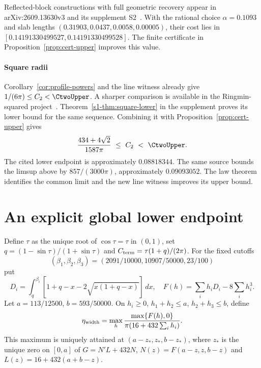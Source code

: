 \documentclass[review,hidelinks,onefignum,onetabnum]{siamart251216}
\begin{document}
\begin{remark}
Reflected-block constructions with full geometric recovery appear in
arXiv:2609.13630v3 and its supplement S2~\cite{supp}. With the rational
choice $\alpha=0.1093$ and slab lengths
$(0.31903,\allowbreak 0.0437,\allowbreak 0.0058,\allowbreak 0.00005)$,
their cost lies in
$[0.14191330499527,\allowbreak 0.14191330499528]$. The finite certificate in
Proposition~\ref{prop:cert-upper} improves this value.
\end{remark}

\paragraph*{Square radii}
Corollary~\ref{cor:profile-powers} and the line witness already give
$1/(6\pi)\le C_2<\CtwoUpper$. A sharper comparison is available in the
Ringmin-squared project~\cite[bounds (22)--(23)]{squared}.
Theorem~\ref{s1-thm:square-lower} in the supplement proves its lower
bound for the same sequence. Combining it with Proposition~\ref{prop:cert-upper} gives
\[
   \frac{434+4\sqrt2}{1587\pi}\ \le\ C_2\ <\ \CtwoUpper .
\]
The cited lower endpoint is approximately $0.08818344$. The same source
bounds the limsup above by $857/(3000\pi)$, approximately $0.09093052$.
The law theorem identifies the common limit and the new line witness
improves its upper bound.

\section{An explicit global lower endpoint}

Define $\tau$ as the unique root of $\cos\tau=\tau$ in $(0,1)$, set
$q=(1-\sin\tau)/(1+\sin\tau)$ and
$C_{\rm term}=\tau(1+q)/(2\pi)$.
For the fixed cutoffs
\[
 (\beta_1,\beta_2,\beta_3)=(2091/10000,10907/50000,23/100)
\]
put
\[
 D_i=\int_q^{\beta_i}[1+q-x-2\sqrt{x(1+q-x)}]\,dx,
 \quad F(h)=\sum_i h_iD_i-8\sum_i h_i^3.
\]
Let $a=113/12500$, $b=593/50000$. On
$h_i\ge0$, $h_1+h_2\le a$, $h_2+h_3\le b$, define
\[
 \eta_{\rm width}=\max_h
 \frac{\max\{F(h),0\}}{\pi(16+432\sum_i h_i)}.
\]
This maximum is uniquely attained at $(a-z_*,z_*,b-z_*)$, where $z_*$
is the unique zero on $[0,a]$ of $G=N'L+432N$,
$N(z)=F(a-z,z,b-z)$ and $L(z)=16+432(a+b-z)$.
\end{document}
